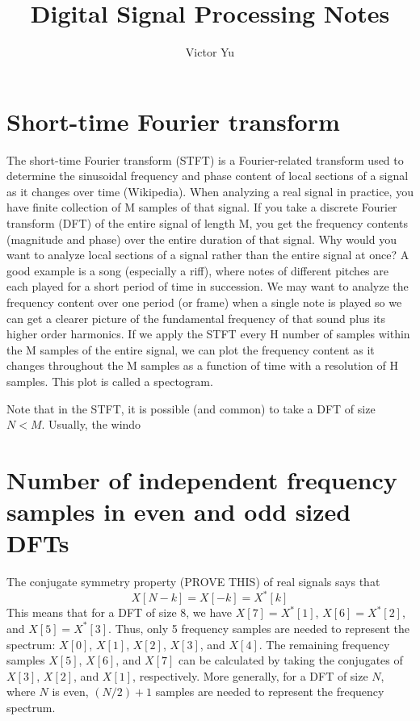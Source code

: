 \documentclass{article}
\author{Victor Yu}
\title{Digital Signal Processing Notes}
\begin{document}
	
	\maketitle
	
	\section{Short-time Fourier transform}
	
	The short-time Fourier transform (STFT) is a Fourier-related transform used to determine the sinusoidal frequency and phase content of local sections of a signal as it changes over time (Wikipedia). When analyzing a real signal in practice, you have finite collection of M samples of that signal. If you take a discrete Fourier transform (DFT) of the entire signal of length M, you get the frequency contents (magnitude and phase) over the entire duration of that signal. Why would you want to analyze local sections of a signal rather than the entire signal at once? A good example is a song (especially a riff), where notes of different pitches are each played for a short period of time in succession. We may want to analyze the frequency content over one period (or frame) when a single note is played so we can get a clearer picture of the fundamental frequency of that sound plus its higher order harmonics. If we apply the STFT every H number of samples within the M samples of the entire signal, we can plot the frequency content as it changes throughout the M samples as a function of time with a resolution of H samples. This plot is called a spectogram.
	
	Note that in the STFT, it is possible (and common) to take a DFT of size $N < M$. Usually, the windo
	
	\section{Number of independent frequency samples in even and odd sized DFTs}
	
	The conjugate symmetry property (PROVE THIS) of real signals says that
	\begin{equation}
	X[N-k] = X[-k] = X^{*}[k]
	\end{equation}
	This means that for a DFT of size 8, we have $X[7] = X^{*}[1]$, $X[6] = X^{*}[2]$, and $X[5] = X^{*}[3]$. Thus, only 5 frequency samples are needed to represent the spectrum: $X[0]$, $X[1]$, $X[2]$, $X[3]$, and $X[4]$. The remaining frequency samples $X[5]$, $X[6]$, and $X[7]$ can be calculated by taking the conjugates of $X[3]$, $X[2]$, and $X[1]$, respectively. More generally, for a DFT of size $N$, where $N$ is even, $(N/2) +1$ samples are needed to represent the frequency spectrum.
	
\end{document}
